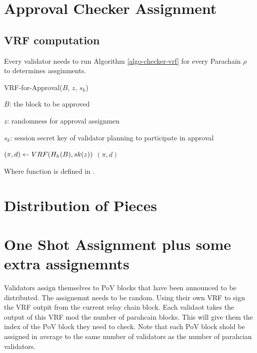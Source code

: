 \section{Approval Checker Assignment}
\subsection{VRF computation}

Every validator needs to run Algorithm \ref{algo-checker-vrf} for every Parachain $\rho$ to determines assginments.

\begin{algorithm}
  \caption[VRF-for-Approval]{\sc VRF-for-Approval($B$, $z$, $s_k$)}
  \label{algo-checker-vrf}
  \begin{algorithmic}[1]
  \Require

    $B$: the block to be approved 

    $z$: randomness for approval assignmen

    $s_k$: session secret key of validator planning to participate in approval

    \State $(\pi, d) \leftarrow \sc{VRF}(H_h(B),sk(z))$
    \State \Return $(\pi,d)$
  \end{algorithmic}
\end{algorithm}

\begin{algorithm}
  \Require{}
  \caption[]{\sc }
  \begin{algorithmic}[1]
    \State
  \end{algorithmic}
\end{algorithm}

Where  function is defined in \cite{polkadot-crypto-spec}.

\section{Distribution of Pieces}\label{distribute-piece}

\section{One Shot Assignment plus some extra assignemnts}\label{shot-assignment}
Validators assign themselves to PoV blocks that have been announced to be distributed. The assignemnt needs to be random. Using their own VRF to sign the VRF outpit from the current relay chain block. Each validaot takes the output of this VRF mod the number of parahcain blocks. This will give them the index of the PoV block they need to check. Note that each PoV block shold be assigned in average to the same number of validators as the number of parahcian validators.

